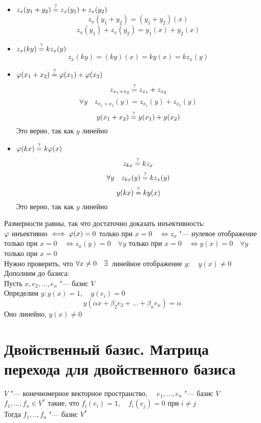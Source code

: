 \begin{eproof}
	\item
	\begin{itemize}
		\item $ z_x(y_1 + y_2) \stackrel?= z_x(y_1) + z_x(y_2) $
		$$ z_x(y_1 + y_2) = (y_1 + y_2)(x) $$
		$$ z_x(y_1) + z_x(y_2) = y_1(x) + y_2(x) $$
		\item $ z_x(ky) \stackrel?= kz_x(y) $
		$$ z_x(ky) = (ky)(x) = ky(x) = kz_x(y) $$
	\end{itemize}

	\item
	\begin{itemize}
		\item $ \varphi(x_1 + x_2) \stackrel?= \varphi(x_1) + \varphi(x_2) $
		$$ z_{x_1 + x_2} \stackrel?= z_{x_1} + z_{x_2} $$
		$$ \forall y \quad z_{x_1 + x_2}(y) = z_{x_1}(y) + z_{x_2}(y) $$
		$$ y(x_1 + x_2) \stackrel?= y(x_1) + y(x_2) $$
		Это верно, так как $ y $ линейно
		\item $ \varphi(kx) \stackrel?= k\varphi(x) $
		$$ z_{kx} \stackrel?= kz_x $$
		$$ \forall y \quad z_{kx}(y) \stackrel?= kz_x(y) $$
		$$ y(kx) \stackrel?= ky(x) $$
		Это верно, так как $ y $ линейно
	\end{itemize}

	\item Размерности равны, так что достаточно доказать инъективность: \\
	$ \varphi $ инъективно $ \iff \varphi(x) = 0 $ только при $ x = 0 \quad \iff z_x $ "--- нулевое отображение только при $ x = 0 \quad \iff z_x(y) = 0 \quad \forall y $ только при $ x = 0 \quad \iff y(x) = 0 \quad \forall y $ только при $ x = 0 $ \\
	Нужно проверить, что $ \forall x \ne 0 \quad \exists\, $ линейное отображение $ y : \quad y(x) \ne 0 $ \\
	Дополним до базиса: \\
	Пусть $ x, e_2, ..., e_n $ "--- базис $ V $ \\
	Определим $ y : y(x) = 1, \quad y(e_i) = 0 $
	$$ y(\alpha x + \beta_2e_2 + ... + \beta_ne_n) = \alpha $$
	Оно линейно, $ y(x) \ne 0 $
\end{eproof}

\section{Двойственный базис. Матрица перехода для двойственного базиса}

\begin{lemma}
	$ V $ "--- конечномерное векторное пространство, $ \quad e_1, ..., e_n $ "--- базис $ V $ \\
	$ f_1, ..., f_n \in V^* $ такие, что $ f_i(e_i) = 1, \quad f_i(e_j) = 0 $ при $ i \ne j $ \\
	Тогда $ f_1, .., f_n $ "--- базис $ V^* $
\end{lemma}

